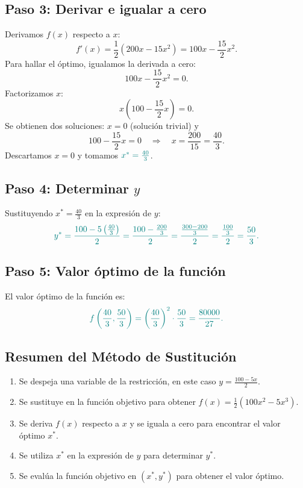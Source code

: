 \documentclass{article}
\begin{document}
\subsection*{Paso 3: Derivar e igualar a cero}
Derivamos \(f(x)\) respecto a \(x\):
\[
f'(x)=\frac{1}{2}\left(200x-15x^2\right)=100x-\frac{15}{2}x^2.
\]
Para hallar el óptimo, igualamos la derivada a cero:
\[
100x-\frac{15}{2}x^2=0.
\]
Factorizamos \(x\):
\[
x\left(100-\frac{15}{2}x\right)=0.
\]
Se obtienen dos soluciones: \(x=0\) (solución trivial) y
\[
100-\frac{15}{2}x=0 \quad\Longrightarrow\quad x=\frac{200}{15}=\frac{40}{3}.
\]
Descartamos \(x=0\) y tomamos \(\color{teal}x^*=\frac{40}{3}\).

\subsection*{Paso 4: Determinar \(y\)}
Sustituyendo \(x^*=\frac{40}{3}\) en la expresión de \(y\):
\[\color{teal}
y^*=\frac{100-5\left(\frac{40}{3}\right)}{2}=\frac{100-\frac{200}{3}}{2}=\frac{\frac{300-200}{3}}{2}=\frac{\frac{100}{3}}{2}=\frac{50}{3}.
\]

\subsection*{Paso 5: Valor óptimo de la función}
El valor óptimo de la función es:
\[\color{teal}
f\left(\frac{40}{3},\frac{50}{3}\right)=\left(\frac{40}{3}\right)^2\cdot\frac{50}{3}=\frac{80000}{27}.
\]

\subsection*{Resumen del Método de Sustitución}
\begin{enumerate}
    \item Se despeja una variable de la restricción, en este caso \(y=\frac{100-5x}{2}\).
    \item Se sustituye en la función objetivo para obtener \(f(x)=\frac{1}{2}(100x^2-5x^3)\).
    \item Se deriva \(f(x)\) respecto a \(x\) y se iguala a cero para encontrar el valor óptimo \(x^*\).
    \item Se utiliza \(x^*\) en la expresión de \(y\) para determinar \(y^*\).
    \item Se evalúa la función objetivo en \((x^*,y^*)\) para obtener el valor óptimo.
\end{enumerate}
\end{document}
